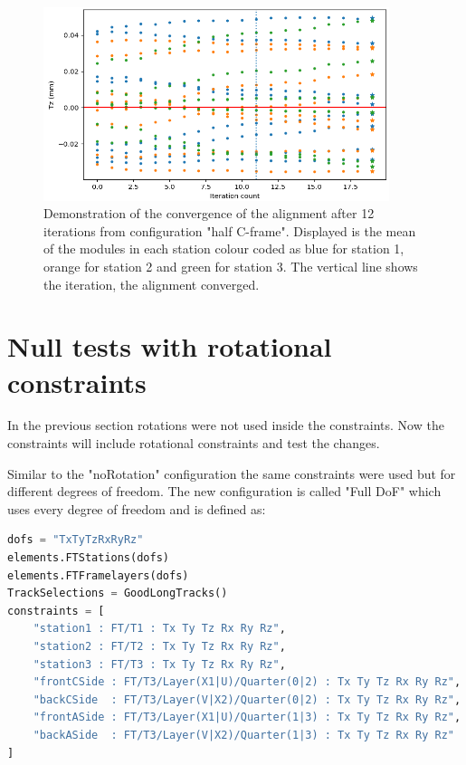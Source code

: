 \begin{figure}
  \centering
  \includegraphics[width=0.9\textwidth]{plots/scatter_fig_4_4_convergence.png}
  \caption{Demonstration of the convergence of the alignment after 12 iterations from configuration "half C-frame". Displayed is the mean of the modules in each station colour coded  as blue for station 1, orange for station 2 and green for station 3. The vertical line shows the iteration, the alignment converged.}
  \label{fig:conv}
\end{figure}

\section{Null tests with rotational constraints}
In the previous section rotations were not used inside the constraints. Now the constraints will include rotational constraints and test the changes.

Similar to the "noRotation" configuration the same constraints were used but for different degrees of freedom. The new configuration is called "Full DoF" which uses every degree of freedom and is defined as:

\begin{lstlisting}[language=Python, basicstyle=\footnotesize]
dofs = "TxTyTzRxRyRz"
elements.FTStations(dofs)
elements.FTFramelayers(dofs)
TrackSelections = GoodLongTracks()
constraints = [
    "station1 : FT/T1 : Tx Ty Tz Rx Ry Rz",
    "station2 : FT/T2 : Tx Ty Tz Rx Ry Rz",
    "station3 : FT/T3 : Tx Ty Tz Rx Ry Rz",
    "frontCSide : FT/T3/Layer(X1|U)/Quarter(0|2) : Tx Ty Tz Rx Ry Rz",
    "backCSide  : FT/T3/Layer(V|X2)/Quarter(0|2) : Tx Ty Tz Rx Ry Rz",
    "frontASide : FT/T3/Layer(X1|U)/Quarter(1|3) : Tx Ty Tz Rx Ry Rz",
    "backASide  : FT/T3/Layer(V|X2)/Quarter(1|3) : Tx Ty Tz Rx Ry Rz"
]
\end{lstlisting}

